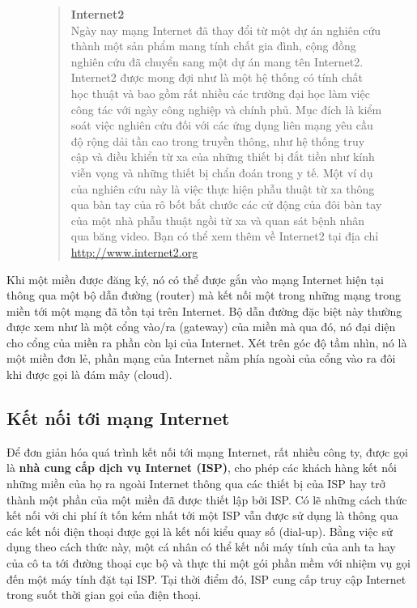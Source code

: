 \begin{figure}[t]
  \begin{quotation}
    \noindent
    \textbf{Internet2} \vspace{0.3cm}
    \\
    Ngày nay mạng Internet đã thay đổi từ một dự án nghiên cứu thành một sản phẩm mang
    tính chất gia đình, cộng đồng nghiên cứu đã chuyển sang một dự án mang tên
    Internet2. Internet2 được mong đợi như là một hệ thống có tính chất học thuật và bao
    gồm rất nhiều các trường đại học làm việc công tác với ngày công nghiệp và chính
    phủ. Mục đích là kiểm soát việc nghiên cứu đối với các ứng dụng liên mạng yêu cầu độ
    rộng dải tần cao trong truyền thông, như hệ thống truy cập và điều khiển từ xa của
    những thiết bị đắt tiền như kính viễn vọng và những thiết bị chẩn đoán trong y tế. Một
    ví dụ của nghiên cứu này là việc thực hiện phẫu thuật từ xa thông qua bàn tay của rô
    bốt bắt chước các cử động của đôi bàn tay của một nhà phẫu thuật ngồi từ xa và quan
    sát bệnh nhân qua băng video. Bạn có thể xem thêm về Internet2 tại địa chỉ \url{
      http://www.internet2.org}
  \end{quotation}
\end{figure}


Khi một miền được đăng ký, nó có thể được gắn vào mạng Internet hiện tại thông qua một bộ
dẫn đường (router) mà kết nối một trong những mạng trong miền tới một mạng đã tồn tại trên
Internet. Bộ dẫn đường đặc biệt này thường được xem như là một cổng vào/ra (gateway) của
miền mà qua đó, nó đại diện cho cổng của miền ra phần còn lại của Internet. Xét trên góc
độ tầm nhìn, nó là một miền đơn lẻ, phần mạng của Internet nằm phía ngoài của cổng vào ra đôi
khi được gọi là đám mây (cloud).

\subsection*{Kết nối tới mạng Internet}

Để đơn giản hóa quá trình kết nối tới mạng Internet, rất nhiều công ty, được gọi là
\textbf{nhà cung cấp dịch vụ Internet (ISP)}, cho phép các khách hàng kết nối những miền
của họ ra ngoài Internet thông qua các thiết bị của ISP hay trở thành một phần của một
miền đã được thiết lập bởi ISP. Có lẽ những cách thức kết nối với chi phí ít tốn kém nhất
tới một ISP vẫn được sử dụng là thông qua các kết nối điện thoại được gọi là kết nối kiểu
quay số (dial-up). Bằng việc sử dụng theo cách thức này, một cá nhân có thể kết nối máy
tính của anh ta hay của cô ta tới đường thoại cục bộ và thực thi một gói phần mềm với
nhiệm vụ gọi đến một máy tính đặt tại ISP. Tại thời điểm đó, ISP cung cấp truy cập
Internet trong suốt thời gian gọi của điện thoại.


